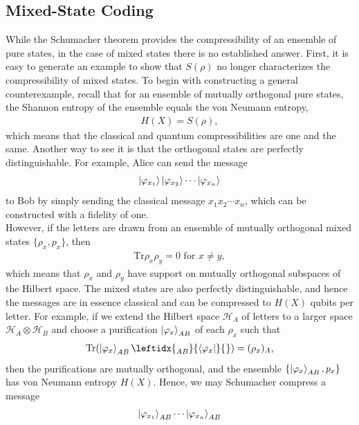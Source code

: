 \documentclass[a4paper, 12pt]{article}
\numberwithin{equation}{section}
\numberwithin{figure}{section}
\theoremstyle{definition}
\begin{document}
    \subsection{Mixed-State Coding}
    While the Schumacher theorem provides the compressibility of an ensemble of pure states, in the case of mixed states there is no established answer. First, it is easy to generate an example to show that $S(\rho)$ no longer characterizes the compressibility of mixed states. To begin with constructing a general counterexample, recall that for an ensemble of mutually orthogonal pure states, the Shannon entropy of the ensemble equals the von Neumann entropy,
    \begin{align}
        H(X) = S(\rho),
    \end{align}
    which means that the classical and quantum compressibilities are one and the same. Another way to see it is that the orthogonal states are perfectly distinguishable. For example, Alice can send the message
    \begin{align}
        \ket{\varphi_{x_1}} \ket{\varphi_{x_2}} \cdots \ket{\varphi_{x_n}}
    \end{align}
    to Bob by simply sending the classical message $x_1 x_2 \cdots x_n$, which can be constructed with a fidelity of one. \\
    However, if the letters are drawn from an ensemble of mutually orthogonal mixed states $\{ \rho_x, p_x \}$, then
    \begin{align}
        \text{Tr} \rho_x \rho_y = 0 \text{ for } x \neq y,
    \end{align}
    which means that $\rho_x$ and $\rho_y$ have support on mutually orthogonal subspaces of the Hilbert space. The mixed states are also perfectly distinguishable, and hence the messages are in essence classical and can be compressed to $H(X)$ qubits per letter. For example, if we extend the Hilbert space $\mathcal{H}_A$ of letters to a larger space $\mathcal{H}_A \otimes \mathcal{H}_B$ and choose a purification $\ket{\varphi_x}_{AB}$ of each $\rho_x$ such that
    \begin{align}
        \text{Tr}(\ket{\varphi_x}_{AB} \leftidx{_{AB}^{}}{\bra{\varphi_x}}{_{}^{}}) = (\rho_x)_A,
    \end{align}
    then the purifications are mutually orthogonal, and the ensemble $\{ \ket{\varphi_x}_{AB}, p_x \}$ has von Neumann entropy $H(X)$. Hence, we may Schumacher compress a message
    \begin{align}
        \ket{\varphi_{x_1}}_{AB} \cdots \ket{\varphi_{x_n}}_{AB}
    \end{align}
\end{document}
